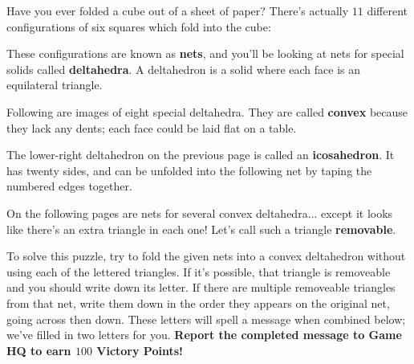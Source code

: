 
\begin{puzzle}
Have you ever folded a cube out of a sheet of paper? There's actually
\(11\) different configurations of six squares which fold into the cube:


These configurations are known as \textbf{nets}, and you'll be looking at
nets for special solids called \textbf{deltahedra}. A deltahedron is a solid
where each face is an equilateral triangle.

Following are images of eight special deltahedra. They are called
\textbf{convex} because they lack any dents; each face could be laid flat on
a table.


\newpage

The lower-right deltahedron on the previous page
is called an \textbf{icosahedron}. It has
twenty sides, and can be unfolded into the following net by taping the
numbered edges together.

\begin{center}\small
\def\svgwidth{.6\linewidth}

\end{center}

\vfill

On the following pages are nets for several convex deltahedra...
except it looks like there's an extra triangle in each one! Let's call
such a triangle \textbf{removable}.

To solve this puzzle, try to fold the given nets into a convex deltahedron
without using each of the lettered triangles. If it's possible, that triangle
is removeable and you should write down
its letter. If there are multiple removeable triangles from that net,
write them down in the order they appears on the original net, going
across then down. These letters will spell a message when combined below;
we've filled in two letters for you.
\textbf{Report the completed message to Game HQ to earn \(100\) Victory Points!}

\vfill

\begin{center}
    \hspace{3em}
\end{center}
\begin{center}
    \hspace{3em}
\end{center}


\end{puzzle}

